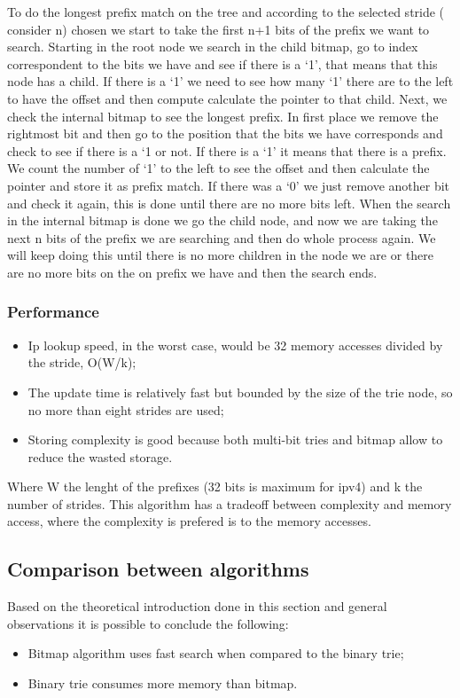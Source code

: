\documentclass[]{report}
\begin{document}
To do the longest prefix match on the tree and according to the selected stride ( consider n) chosen we start to take the first n+1 bits of the prefix we want to search. Starting in the root node we search in the child bitmap, go to index correspondent to the bits we have and see if there is a ‘1’, that means that this node has a child. If there is a ‘1’ we need to see how many ‘1’ there are to the left to have the offset and then compute calculate the pointer to that child. Next, we check the internal bitmap to see the longest prefix. In first place we remove the rightmost bit and then go to the position that the bits we have corresponds and check to see if there is a ‘1 or not. If there is a ‘1’ it means that there is a prefix. We count the number of ‘1’ to the left to see the offset and then calculate the pointer and store it as prefix match. If there was a ‘0’ we just remove another bit and check it again, this is done until there are no more bits left. When the search in the internal bitmap is done we go the child node, and now we are taking the next n bits of the prefix we are searching and then do whole process again. We will keep doing this until there is no more children in the node we are or there are no more bits on the on prefix we have and then the search ends.

\subsubsection{Performance}
\begin{itemize}
\item Ip lookup speed, in the worst case, would be 32 memory accesses divided by the stride, O(W/k);
\item The update time is relatively fast but bounded by the size of the trie node, so no more than eight strides are used;
\item Storing complexity is good because both multi-bit tries and bitmap allow to reduce the wasted storage. 
\end{itemize}

Where W the lenght of the prefixes (32 bits is maximum for ipv4) and k the number of strides. This algorithm has a tradeoff between complexity and memory access, where the complexity is prefered is to the memory accesses.


\subsection{Comparison between algorithms}
Based on the theoretical introduction done in this section and general observations it is possible to conclude the following: 
\begin{itemize}
\item Bitmap algorithm uses fast search when compared to the binary trie;
\item Binary trie consumes more memory than bitmap.
\end{itemize}
\end{document}
